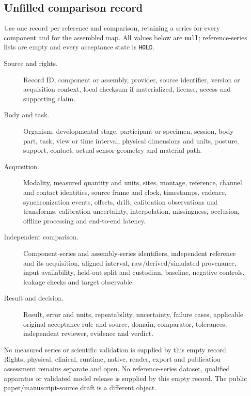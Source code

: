 \subsection*{Unfilled comparison record}

Use one record per reference and comparison, retaining a series for every
component and for the assembled map. All values below are \texttt{null};
reference-series lists are empty and every acceptance state is \texttt{HOLD}.

\begin{description}
\item[Source and rights.] Record ID, component or assembly, provider, source
identifier, version or acquisition context, local checksum if materialized,
license, access and supporting claim.
\item[Body and task.] Organism, developmental stage, participant or specimen,
session, body part, task, view or time interval, physical dimensions and units,
posture, support, contact, actual sensor geometry and material path.
\item[Acquisition.] Modality, measured quantity and units, sites, montage,
reference, channel and contact identities, source frame and clock, timestamps,
cadence, synchronization events, offsets, drift, calibration observations and
transforms, calibration uncertainty, interpolation, missingness, occlusion,
offline processing and end-to-end latency.
\item[Independent comparison.] Component-series and assembly-series identifiers,
independent reference and its acquisition, aligned interval, raw/derived/simulated
provenance, input availability, held-out split and custodian, baseline, negative
controls, leakage checks and target observable.
\item[Result and decision.] Result, error and units, repeatability, uncertainty,
failure cases, applicable original acceptance rule and source, domain,
comparator, tolerances, independent reviewer, evidence and verdict.
\end{description}

No measured series or scientific validation is supplied by this empty record.
Rights, physical, clinical, runtime, native, render, export and publication
assessment remains separate and open. No reference-series dataset, qualified apparatus or validated model release is supplied by this empty record. The public paper/manuscript-source draft is a different object.
